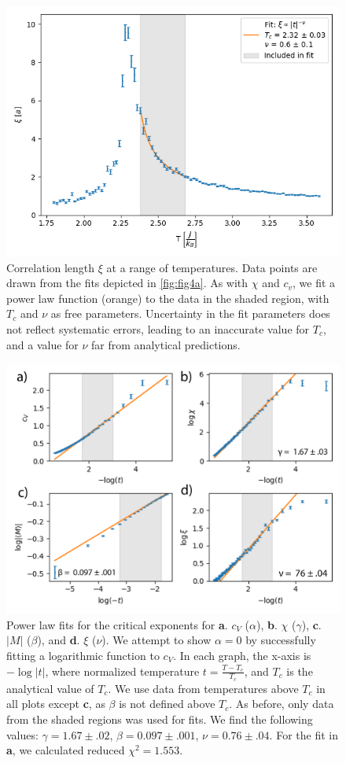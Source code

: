 \documentclass[letter,scriptaddress,twocolumn, prl,nofootinbib]{revtex4}
\begin{document}
\begin{figure}[h]
	\begin{center}
		\includegraphics[width=.5\textwidth]{figs/fig4_xi.png}
		\caption{Correlation length $\xi$ at a range of temperatures. Data points are drawn from the fits depicted in \autoref{fig:fig4a}. As with $\chi$ and $c_v$, we fit a power law function (orange) to the data in the shaded region, with $T_c$ and $\nu$ as free parameters. Uncertainty in the fit parameters does not reflect systematic errors, leading to an inaccurate value for $T_c$, and a value for $\nu$ far from analytical predictions.}
		\label{fig:fig4b}
	\end{center}
\end{figure}

\begin{figure}[h]
	\begin{center}
		\includegraphics[width=1\textwidth]{figs/lastfig.png}
		\caption{Power law fits for the critical exponents for \textbf{a}. $c_V$ ($\alpha$), \textbf{b}. $\chi$ ($\gamma$), \textbf{c}. $|M|$ ($\beta$), and \textbf{d}. $\xi$ ($\nu$). We attempt to show $\alpha = 0$ by successfully fitting a logarithmic function to $c_V$. In each graph, the x-axis is $-\log{|t|}$, where normalized temperature $t = \frac{T - T_c}{T_c}$, and $T_c$ is the analytical value of $T_c$. We use data from temperatures above $T_c$ in all plots except \textbf{c}, as $\beta$ is not defined above $T_c$. As before, only data from the shaded regions was used for fits. We find the following values: $\gamma = 1.67 \pm .02$, $\beta = 0.097 \pm .001$, $\nu = 0.76 \pm .04$. For the fit in \textbf{a}, we calculated reduced $\chi^2 = 1.553$.}
		\label{fig:fig5}
	\end{center}
\end{figure}
\end{document}
